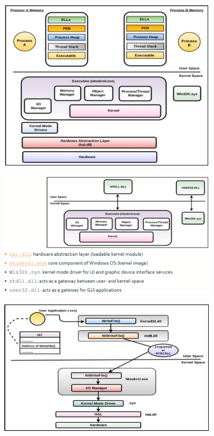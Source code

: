\documentclass[]{project_plan}
\begin{document}
\begin{figure}[H]
  \centering
  \includegraphics[width=\linewidth]{process memory 2.png}
\end{figure}

\begin{figure}[H]
  \centering
  \includegraphics[width=\linewidth]{process memory 3.png}
\end{figure}

\begin{figure}[H]
  \centering
  \includegraphics[width=\linewidth]{process memory 4.png}
\end{figure}
\end{document}
